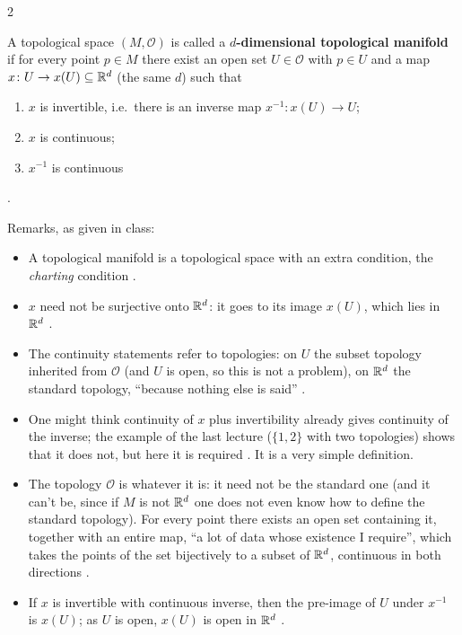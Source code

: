 \begin{paracol}{2}
\begin{definition}\label{def:c02-manifold}
A topological space $(M,\mathcal O)$ is called a \textbf{$d$-dimensional topological manifold} if for every point $p\in M$ there exist an open set
$U\in\mathcal O$ with $p\in U$ and a map $x\colon U\to x(U)\subseteq\mathbb{R}^d$ (the same $d$) such that
\begin{enumerate}
  \item $x$ is invertible, i.e.\ there is an inverse map $x^{-1}\colon x(U)\to U$;
  \item $x$ is continuous;
  \item $x^{-1}$ is continuous
\end{enumerate}
.
\end{definition}
Remarks, as given in class:
\begin{itemize}
  \item A topological manifold is a topological space with an extra condition, the \emph{charting} condition .
  \item $x$ need not be surjective onto $\mathbb{R}^d$: it goes to its image $x(U)$, which lies in $\mathbb{R}^d$ .
  \item The continuity statements refer to topologies: on $U$ the subset topology inherited from $\mathcal O$ (and $U$ is open, so this is not a problem), on $\mathbb{R}^d$
        the standard topology, ``because nothing else is said'' .
  \item One might think continuity of $x$ plus invertibility already gives continuity of the inverse; the example of the last lecture ($\{1,2\}$ with two topologies) shows
        that it does not, but here it is required . It is a very simple definition.
  \item The topology $\mathcal O$ is whatever it is: it need not be the standard one (and it can't be, since if $M$ is not $\mathbb{R}^d$ one does not even know how to define the standard
        topology). For every point there exists an open set containing it, together with an entire map, ``a lot of data whose existence I require'', which takes the points of the
        set bijectively to a subset of $\mathbb{R}^d$, continuous in both directions .
  \item If $x$ is invertible with continuous inverse, then the pre-image of $U$ under $x^{-1}$ is $x(U)$; as $U$ is open, $x(U)$ is open in $\mathbb{R}^d$
        .
\end{itemize}


\end{paracol}

